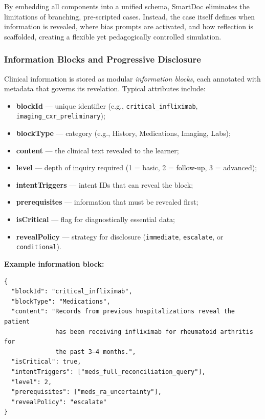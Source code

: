 By embedding all components into a unified schema, SmartDoc eliminates the limitations
of branching, pre-scripted cases.
Instead, the case itself defines when information is revealed, where bias prompts are
activated, and how reflection is scaffolded, creating a flexible yet pedagogically
controlled simulation.

\subsubsection{Information Blocks and Progressive Disclosure}

Clinical information is stored as modular \textit{information blocks}, each annotated
with metadata that governs its revelation.  
Typical attributes include:

\begin{itemize}
  \item \textbf{blockId} — unique identifier (e.g.,
  \texttt{critical\_infliximab}, \texttt{imaging\_cxr\_preliminary});
  \item \textbf{blockType} — category (e.g., History, Medications, Imaging, Labs);
  \item \textbf{content} — the clinical text revealed to the learner;
  \item \textbf{level} — depth of inquiry required (1 = basic, 2 = follow-up, 3 = advanced);
  \item \textbf{intentTriggers} — intent IDs that can reveal the block;
  \item \textbf{prerequisites} — information that must be revealed first;
  \item \textbf{isCritical} — flag for diagnostically essential data;
  \item \textbf{revealPolicy} — strategy for disclosure (\texttt{immediate},
  \texttt{escalate}, or \texttt{conditional}).
\end{itemize}

\noindent
\textbf{Example information block:}

\begin{verbatim}
{
  "blockId": "critical_infliximab",
  "blockType": "Medications",
  "content": "Records from previous hospitalizations reveal the patient
              has been receiving infliximab for rheumatoid arthritis for
              the past 3–4 months.",
  "isCritical": true,
  "intentTriggers": ["meds_full_reconciliation_query"],
  "level": 2,
  "prerequisites": ["meds_ra_uncertainty"],
  "revealPolicy": "escalate"
}
\end{verbatim}

